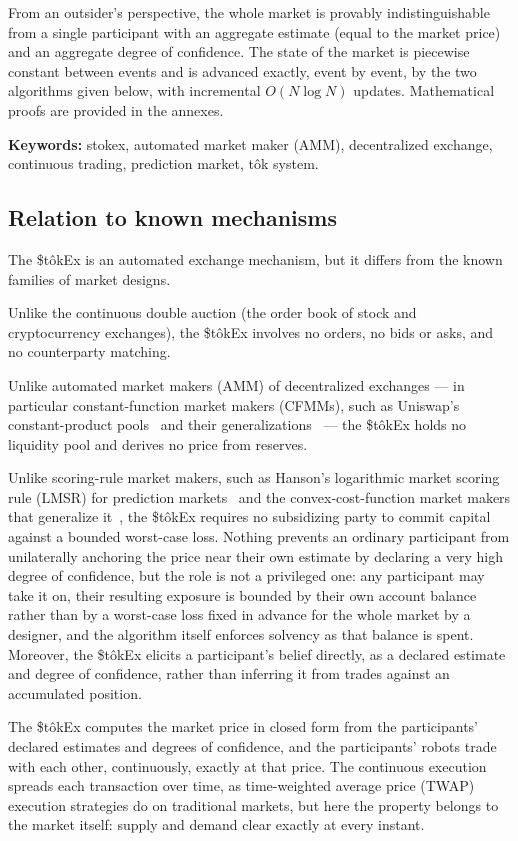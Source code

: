 \documentclass[letterpaper]{article}
\newcommand{\StokEx}{\$t\^{o}kEx}
\begin{document}
From an outsider's perspective, the whole market is provably indistinguishable from a single participant
with an aggregate estimate (equal to the market price) and an aggregate degree of confidence.
The state of the market is piecewise constant between events and is advanced exactly, event by event,
by the two algorithms given below, with incremental $O(N \log N)$ updates.
Mathematical proofs are provided in the annexes.

\textbf{Keywords:} stokex, automated market maker (AMM), decentralized exchange,
continuous trading, prediction market, t\^{o}k system.

\subsection*{Relation to known mechanisms} %
The \StokEx{} is an automated exchange mechanism, but it differs from the known families of market designs.

Unlike the continuous double auction (the order book of stock and cryptocurrency exchanges),
the \StokEx{} involves no orders, no bids or asks, and no counterparty matching.

Unlike automated market makers (AMM) of decentralized exchanges ---
in particular constant-function market makers (CFMMs),
such as Uniswap's constant-product pools~\cite{UniswapV2} and their generalizations~\cite{AngerisChitra2020} ---
the \StokEx{} holds no liquidity pool and derives no price from reserves.

Unlike scoring-rule market makers,
such as Hanson's logarithmic market scoring rule (LMSR) for prediction markets~\cite{Hanson2003}
and the convex-cost-function market makers that generalize it~\cite{AbernethyChenVaughan2013},
the \StokEx{} requires no subsidizing party to commit capital against a bounded worst-case loss.
Nothing prevents an ordinary participant from unilaterally anchoring the price near their own estimate
by declaring a very high degree of confidence,
but the role is not a privileged one: any participant may take it on,
their resulting exposure is bounded by their own account balance
rather than by a worst-case loss fixed in advance for the whole market by a designer,
and the algorithm itself enforces solvency as that balance is spent.
Moreover, the \StokEx{} elicits a participant's belief directly,
as a declared estimate and degree of confidence,
rather than inferring it from trades against an accumulated position.

The \StokEx{} computes the market price in closed form
from the participants' declared estimates and degrees of confidence,
and the participants' robots trade with each other, continuously, exactly at that price.
The continuous execution spreads each transaction over time,
as time-weighted average price (TWAP) execution strategies do on traditional markets,
but here the property belongs to the market itself: supply and demand clear exactly at every instant.
\end{document}
